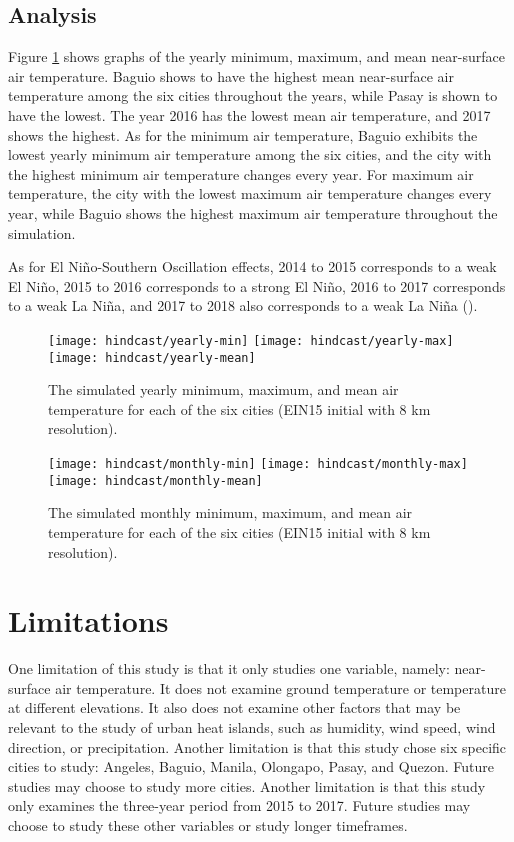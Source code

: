	\subsection{Analysis}
		Figure \ref{fig:hindcast-yearly-stats} shows graphs of the yearly minimum, maximum, and mean near-surface air temperature.
		Baguio shows to have the highest mean near-surface air temperature among the six cities throughout the years,
			while Pasay is shown to have the lowest.
		The year 2016 has the lowest mean air temperature, and 2017 shows the highest.
		As for the minimum air temperature, Baguio exhibits the lowest yearly minimum air temperature among the six cities,
			and the city with the highest minimum air temperature changes every year.
		For maximum air temperature, the city with the lowest maximum air temperature changes every year,
			while Baguio shows the highest maximum air temperature throughout the simulation.
		
		As for El Niño-Southern Oscillation effects,
			2014 to 2015 corresponds to a weak El Niño,
			2015 to 2016 corresponds to a strong El Niño,
			2016 to 2017 corresponds to a weak La Niña,
			and
			2017 to 2018 also corresponds to a weak La Niña
			(\cite{Null2025}).
		
		\begin{figure}	
			\centering
			\texttt{[image: hindcast/yearly-min]}
			\texttt{[image: hindcast/yearly-max]}
			\texttt{[image: hindcast/yearly-mean]}
			\caption{
				The simulated yearly minimum, maximum, and mean air temperature for each of the six cities (EIN15 initial with 8 km resolution).
			}
			\label{fig:hindcast-yearly-stats}
		\end{figure}
	
		\begin{figure}	
			\centering
			\texttt{[image: hindcast/monthly-min]}
			\texttt{[image: hindcast/monthly-max]}
			\texttt{[image: hindcast/monthly-mean]}
			\caption{
				The simulated monthly minimum, maximum, and mean air temperature for each of the six cities (EIN15 initial with 8 km resolution).
			}
			\label{fig:hindcast-monthly-stats}
		\end{figure}

\section{Limitations}
	One limitation of this study is that it only studies one variable, namely: near-surface air temperature.
	It does not examine ground temperature or temperature at different elevations.
	It also does not examine other factors that may be relevant to the study of urban heat islands, such as humidity, wind speed, wind direction, or precipitation. 
	Another limitation is that this study chose six specific cities to study: Angeles, Baguio, Manila, Olongapo, Pasay, and Quezon.
	Future studies may choose to study more cities.
	Another limitation is that this study only examines the three-year period from 2015 to 2017.
	Future studies may choose to study these other variables or study longer timeframes.
	
